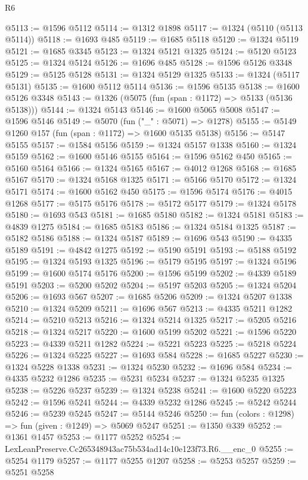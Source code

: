 \begin{lexlean}{R6}
\begin{coremodule}
@5113 := @1596 @5112
@5114 := @1312 @1898
@5117 := @1324 (@5110 (@5113 @5114))
@5118 := @1693 @485
@5119 := @1685 @5118
@5120 := @1324 @5119
@5121 := @1685 @3345
@5123 := @1324 @5121 @1325
@5124 := @5120 @5123
@5125 := @1324 @5124
@5126 := @1696 @485
@5128 := @1596 @5126 @3348
@5129 := @5125 @5128
@5131 := @1324 @5129 @1325
@5133 := @1324 (@5117 @5131)
@5135 := @1600 @5112 @5114
@5136 := @1596 @5135
@5138 := @1600 @5126 @3348
@5143 := @1326 (@5075 (fun (span : @1172) => @5133 (@5136 @5138)))
@5144 := @1324 @5143
@5146 := @1600 @5065 @5008
@5147 := @1596 @5146
@5149 := @5070 (fun ("_" : @5071) => @1278)
@5155 := @5149 @1260 @157 (fun (span : @1172) => @1600 @5135 @5138)
@5156 := @5147 @5155
@5157 := @1584 @5156
@5159 := @1324 @5157 @1338
@5160 := @1324 @5159
@5162 := @1600 @5146 @5155
@5164 := @1596 @5162 @450
@5165 := @5160 @5164
@5166 := @1324 @5165
@5167 := @4012 @1268
@5168 := @1685 @5167
@5170 := @1324 @5168 @1325
@5171 := @5166 @5170
@5172 := @1324 @5171
@5174 := @1600 @5162 @450
@5175 := @1596 @5174
@5176 := @4015 @1268
@5177 := @5175 @5176
@5178 := @5172 @5177
@5179 := @1324 @5178
@5180 := @1693 @543
@5181 := @1685 @5180
@5182 := @1324 @5181
@5183 := @4839 @1275
@5184 := @1685 @5183
@5186 := @1324 @5184 @1325
@5187 := @5182 @5186
@5188 := @1324 @5187
@5189 := @1696 @543
@5190 := @4335 @5189
@5191 := @4842 @1275
@5192 := @5190 @5191
@5193 := @5188 @5192
@5195 := @1324 @5193 @1325
@5196 := @5179 @5195
@5197 := @1324 @5196
@5199 := @1600 @5174 @5176
@5200 := @1596 @5199
@5202 := @4339 @5189 @5191
@5203 := @5200 @5202
@5204 := @5197 @5203
@5205 := @1324 @5204
@5206 := @1693 @567
@5207 := @1685 @5206
@5209 := @1324 @5207 @1338
@5210 := @1324 @5209
@5211 := @1696 @567
@5213 := @4335 @5211 @1282
@5214 := @5210 @5213
@5216 := @1324 @5214 @1325
@5217 := @5205 @5216
@5218 := @1324 @5217
@5220 := @1600 @5199 @5202
@5221 := @1596 @5220
@5223 := @4339 @5211 @1282
@5224 := @5221 @5223
@5225 := @5218 @5224
@5226 := @1324 @5225
@5227 := @1693 @584
@5228 := @1685 @5227
@5230 := @1324 @5228 @1338
@5231 := @1324 @5230
@5232 := @1696 @584
@5234 := @4335 @5232 @1286
@5235 := @5231 @5234
@5237 := @1324 @5235 @1325
@5238 := @5226 @5237
@5239 := @1324 @5238
@5241 := @1600 @5220 @5223
@5242 := @1596 @5241
@5244 := @4339 @5232 @1286
@5245 := @5242 @5244
@5246 := @5239 @5245
@5247 := @5144 @5246
@5250 := fun (colors : @1298) => fun (given : @1249) => @5069 @5247
@5251 := @1350 @339
@5252 := @1361 @1457
@5253 := @1177 @5252
@5254 := LexLeanPreserve.Cc265348943ac75b534ad14c10e123f73.R6.__enc_0
@5255 := @5254 @1179
@5257 := @1177 @5255 @1207
@5258 := @5253 @5257
@5259 := @5251 @5258

\end{coremodule}
\end{lexlean}
